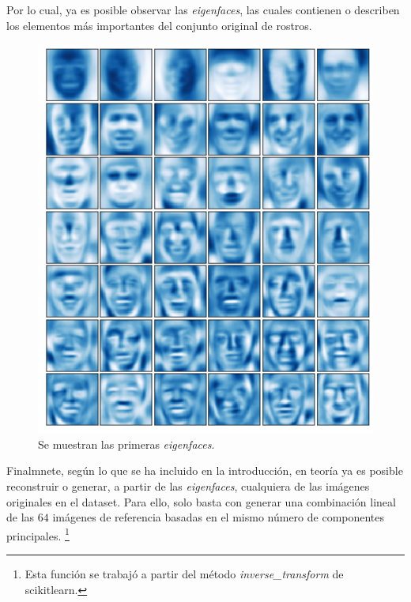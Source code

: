 \documentclass[conference]{IEEEtran}
\begin{document}
Por lo cual, ya es posible observar las \textit{eigenfaces}, las cuales contienen o describen los elementos más importantes del conjunto original de rostros.

\begin{figure}[H]
    \centering
    \includegraphics[scale=0.25]{imgs/eigenfaces.png}
    \caption{Se muestran las primeras \textit{eigenfaces}.}
    \label{fig:svd_pc}
\end{figure}

Finalmnete, según lo que se ha incluido en la introducción, en teoría ya es posible reconstruir o generar, a partir de las \textit{eigenfaces}, cualquiera de las imágenes originales en el dataset. Para ello, solo basta con generar una combinación lineal de las $64$ imágenes de referencia basadas en el mismo número de componentes principales. \footnote{Esta función se trabajó a partir del método \textit{inverse\_transform} de scikit\-learn.}
\end{document}
